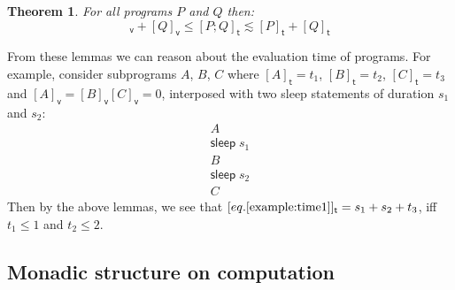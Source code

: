 \documentclass[preprint]{sigplanconf}
\renewcommand{\leq}{\leqslant}
\newtheorem{theorem}{Theorem}
\theoremstyle{definition}
\newcommand{\sleep}{\mathsf{sleep}\;}
\newcommand{\vtime}[1]{[#1]_{\mathsf{v}}}
\newcommand{\etime}[1]{[#1]_{\mathsf{t}}}
\begin{document}
\begin{theorem}
For all programs $P$ and $Q$ then:
\begin{equation}
\vtime{P} + \vtime{Q} \leq \etime{P; Q} \lesssim \etime{P} + \etime{Q}
\end{equation}
\label{theorem:main}
\end{theorem}


From these lemmas we can reason about the evaluation time of programs.
For example, consider subprograms $A$, $B$, $C$ where 
$\etime{A} = t_1$, $\etime{B} = t_2$, $\etime{C} = t_3$ and
$\vtime{A} = \vtime{B} \vtime{C} = 0$, interposed with two
sleep statements of duration $s_1$ and $s_2$:
%
\begin{equation}
\begin{array}{l}
A \\
\sleep s_1 \\
B  \\
\sleep s_2 \\
C
\end{array}
\label{example:time1}
\end{equation}
Then by the above lemmas, we see that $\etime{eq. \eqref{example:time1}} = 
s_1 + s_2 + t_3$, iff $t_1 \leq 1$ and $t_2 \leq 2$.



\newcommand{\TM}{\mathsf{TM}}

\subsection{Monadic structure on computation}
\end{document}
